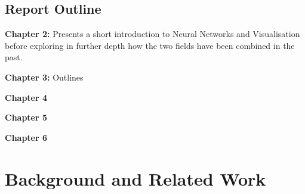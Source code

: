\documentclass[a4paper,11pt,titlepage]{article}
\begin{document}
	\subsection{Report Outline}
	\textbf{Chapter 2:} Presents a short introduction to Neural Networks and Visualisation before exploring in further depth how the two fields have been combined in the past.
	\par
	\textbf{Chapter 3:} Outlines 
	\par
	\textbf{Chapter 4} 
	\par
	\textbf{Chapter 5} 
	\par
	\textbf{Chapter 6} 
	\par	
	
\clearpage

\section{Background and Related Work}
\end{document}
